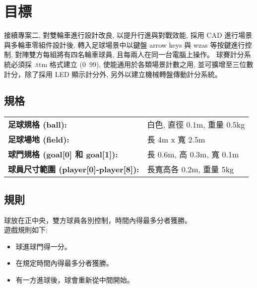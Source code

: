 \documentclass{article}
\begin{document}
\chapter{目標}
接續專案二, 對雙輪車進行設計改良, 以提升行進與對戰效能, 採用 CAD 進行場景與多輪車零組件設計後, 轉入足球場景中以鍵盤 arrow keys 與 wzas 等按鍵進行控制, 對陣雙方每組將有四名輪車球員, 且每兩人在同一台電腦上操作。
球賽計分系統必須採 .ttm 格式建立 (0~99), 使能通用於各類場景計數之用, 並可擴增至三位數計分，除了採用 LED 顯示計分外, 另外以建立機械轉盤傳動計分系統。

\section{規格}
\begin{tabular}{p{8cm}p{20cm}}
  \textbf{足球規格 (ball):} & 白色, 直徑 0.1m, 重量 0.5kg \\
  \textbf{足球場地 (field):} & 長 4m x 寬 2.5m \\
  \textbf{球門規格 (goal[0] 和 goal[1]):} & 長 0.6m, 高 0.3m, 寬 0.1m \\
  \textbf{球員尺寸範圍 (player[0]-player[8]):} & 長寬高各 0.2m, 重量 5kg \\
\end{tabular}

\section{規則}
球放在正中央，雙方球員各別控制，時間內得最多分者獲勝。 \\
遊戲規則如下:
\begin{itemize}
\item 球進球門得一分。
\item 在規定時間內得最多分者獲勝。
\item 有一方進球後，球會重新從中間開始。
\end{itemize}
\end{document}
